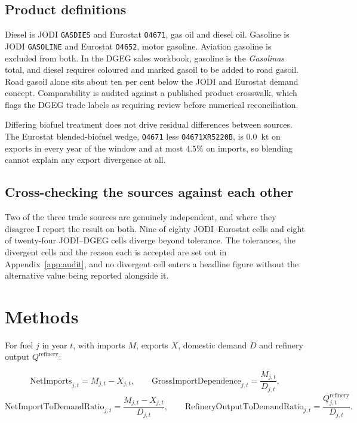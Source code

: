 \documentclass[11pt,a4paper]{article}
\begin{document}
\subsection{Product definitions}

Diesel is JODI \texttt{GASDIES} and Eurostat \texttt{O4671}, gas oil and diesel oil. Gasoline is
JODI \texttt{GASOLINE} and Eurostat \texttt{O4652}, motor gasoline. Aviation gasoline is excluded
from both. In the DGEG sales workbook, gasoline is the \emph{Gasolinas} total, and diesel
requires coloured and marked gasoil to be added to road gasoil. Road gasoil alone sits about ten
per cent below the JODI and Eurostat demand concept. Comparability is audited against a published product crosswalk, which flags the DGEG
trade labels as requiring review before numerical reconciliation.

Differing biofuel treatment does not drive residual differences between sources. The Eurostat
blended-biofuel wedge, \texttt{O4671} less \texttt{O4671XR5220B}, is $0.0$~kt on exports in every
year of the window and at most $4.5\%$ on imports, so blending cannot explain any export
divergence at all.

\subsection{Cross-checking the sources against each other}

Two of the three trade sources are genuinely independent, and where they disagree I report the
result on both. Nine of eighty JODI--Eurostat cells and eight of twenty-four JODI--DGEG cells
diverge beyond tolerance. The tolerances, the divergent cells and the reason each is accepted
are set out in Appendix~\ref{app:audit}, and no divergent cell enters a headline figure without
the alternative value being reported alongside it.

\section{Methods}

For fuel $j$ in year $t$, with imports $M$, exports $X$, domestic demand $D$ and refinery output
$Q^{\text{refinery}}$:

\[
\text{NetImports}_{j,t}=M_{j,t}-X_{j,t},
\qquad
\text{GrossImportDependence}_{j,t}=\frac{M_{j,t}}{D_{j,t}},
\]
\[
\text{NetImportToDemandRatio}_{j,t}=\frac{M_{j,t}-X_{j,t}}{D_{j,t}},
\qquad
\text{RefineryOutputToDemandRatio}_{j,t}=\frac{Q^{\text{refinery}}_{j,t}}{D_{j,t}}.
\]
\end{document}
